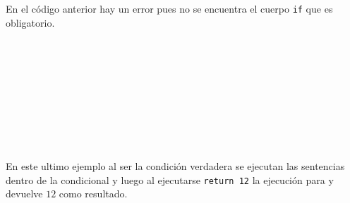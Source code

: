       \begin{fxcode}
         \\
         \\
         \\
         \\
         \\
         \\
         \\
      \end{fxcode}
      
      \begin{fxcode}
         \\   
         \\
         \\
         \\
         \\
      \end{fxcode}
      
      En el código anterior hay un error pues no se encuentra el cuerpo \texttt{if} que es obligatorio.
      
      \begin{fxcode}
         \\
         \\
         \\
         \\
         \\
         \\
         \\
         \\
      \end{fxcode}
      
      En este ultimo ejemplo al ser la condición verdadera se ejecutan las sentencias dentro de la condicional y luego al ejecutarse \texttt{return 12} la ejecución para y devuelve $12$ como resultado.
      
